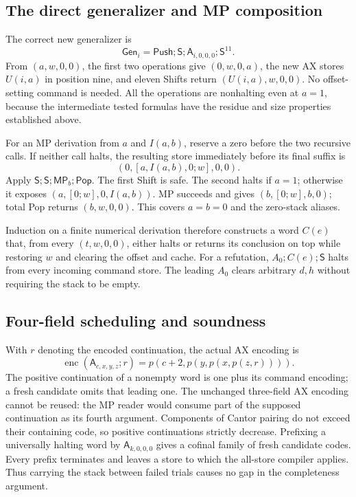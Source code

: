 \subsection{The direct generalizer and MP composition}

The correct new generalizer is
\[
 \mathsf{Gen}_i=\mathsf{Push};\mathsf S;
                 \mathsf A_{i,0,0,0};\mathsf S^{11}.
\]
From $(a,w,0,0)$, the first two operations give $(0,w,0,a)$, the new AX
stores $U(i,a)$ in position nine, and eleven Shifts return
$(U(i,a),w,0,0)$. No offset-setting command is needed. All the operations
are nonhalting even at $a=1$, because the intermediate tested formulas have
the residue and size properties established above.

For an MP derivation from $a$ and $I(a,b)$, reserve a zero before the two
recursive calls. If neither call halts, the resulting store immediately
before its final suffix is
\[
 (0,[a,I(a,b),0;w],0,0).
\]
Apply $\mathsf S;\mathsf S;\mathsf{MP}_b;\mathsf{Pop}$. The first Shift
is safe. The second halts if $a=1$; otherwise it exposes
$(a,[0;w],0,I(a,b))$. MP succeeds and gives $(b,[0;w],b,0)$; total Pop
returns $(b,w,0,0)$. This covers $a=b=0$ and the zero-stack aliases.

Induction on a finite numerical derivation therefore constructs a word
$C(e)$ that, from every $(t,w,0,0)$, either halts or returns its conclusion
on top while restoring $w$ and clearing the offset and cache. For a refutation,
$A_0;C(e);\mathsf S$ halts from every incoming command store. The leading
$A_0$ clears arbitrary $d,h$ without requiring the stack to be empty.

\subsection{Four-field scheduling and soundness}

With $r$ denoting the encoded continuation, the actual AX encoding is
\[
 \operatorname{enc}(\mathsf A_{c,x,y,z};r)
       =p(c+2,p(y,p(x,p(z,r)))).
\]
The positive continuation of a nonempty word is one plus its command
encoding; a fresh candidate omits that leading one. The unchanged
three-field AX encoding cannot be reused: the MP reader would consume part
of the supposed continuation as its fourth argument. Components of Cantor
pairing do not exceed their containing code, so positive continuations
strictly decrease. Prefixing a universally halting word by
$\mathsf A_{k,0,0,0}$ gives a cofinal family of fresh candidate codes.
Every prefix terminates and leaves a store to which the all-store compiler
applies. Thus carrying the stack between failed trials causes no gap in
the completeness argument.

